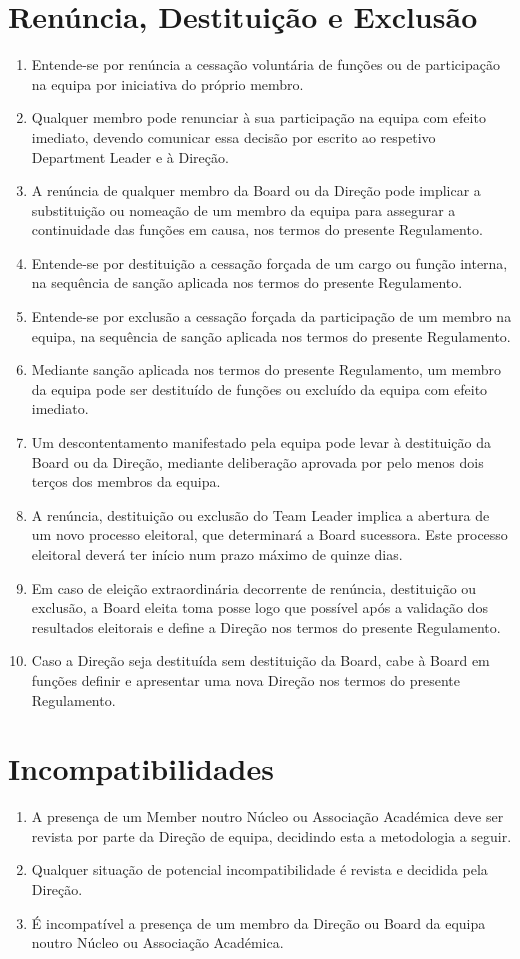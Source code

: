 \section{Renúncia, Destituição e Exclusão}
\begin{enumerate}
  \item Entende-se por renúncia a cessação voluntária de funções ou de participação na equipa por iniciativa do próprio membro.
  \item Qualquer membro pode renunciar à sua participação na equipa com efeito imediato, devendo comunicar essa decisão por escrito ao respetivo Department Leader e à Direção.
  \item A renúncia de qualquer membro da Board ou da Direção pode implicar a substituição ou nomeação de um membro da equipa para assegurar a continuidade das funções em causa, nos termos do presente Regulamento.
  \item Entende-se por destituição a cessação forçada de um cargo ou função interna, na sequência de sanção aplicada nos termos do presente Regulamento.
  \item Entende-se por exclusão a cessação forçada da participação de um membro na equipa, na sequência de sanção aplicada nos termos do presente Regulamento.
  \item Mediante sanção aplicada nos termos do presente Regulamento, um membro da equipa pode ser destituído de funções ou excluído da equipa com efeito imediato.
  \item Um descontentamento manifestado pela equipa pode levar à destituição da Board ou da Direção, mediante deliberação aprovada por pelo menos dois terços dos membros da equipa.
  \item A renúncia, destituição ou exclusão do Team Leader implica a abertura de um novo processo eleitoral, que determinará a Board sucessora. Este processo eleitoral deverá ter início num prazo máximo de quinze dias.
  \item Em caso de eleição extraordinária decorrente de renúncia, destituição ou exclusão, a Board eleita toma posse logo que possível após a validação dos resultados eleitorais e define a Direção nos termos do presente Regulamento.
  \item Caso a Direção seja destituída sem destituição da Board, cabe à Board em funções definir e apresentar uma nova Direção nos termos do presente Regulamento.
\end{enumerate}

\section{Incompatibilidades}
\begin{enumerate}
  \item A presença de um Member noutro Núcleo ou Associação Académica deve ser revista por parte da Direção de equipa, decidindo esta a metodologia a seguir.
  \item Qualquer situação de potencial incompatibilidade é revista e decidida pela Direção.
  \item É incompatível a presença de um membro da Direção ou Board da equipa noutro Núcleo ou Associação Académica.
\end{enumerate}

